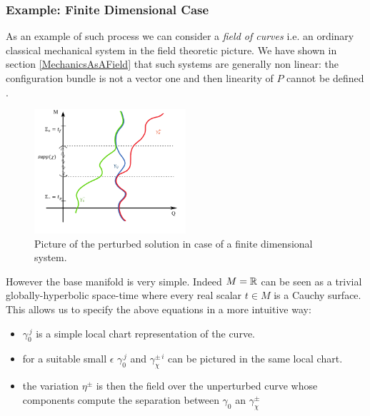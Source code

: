 \documentclass[Main]{subfiles}
\begin{document}
	\subsubsection{Example: Finite Dimensional Case} 
		As an example of such process we can consider a \emph{field of curves} i.e. an ordinary classical mechanical system in the field theoretic picture.
		We have shown in section \ref{MechanicsAsAField} that such systems are generally non linear: the configuration bundle is not a vector one and then linearity of $P$ cannot be defined .
	 	\begin{figure}[h!]\label{GraphicAdvRetSol}
				  \centering
   			\includegraphics[width=0.5\textwidth]{./Pictures/AdvRetSol} 
   	  		\caption{Picture of the perturbed solution in case of a finite dimensional system.}
		\end{figure}			
		
		However the base manifold is very simple. Indeed $M= \mathbb{R}$ can be seen as a trivial globally-hyperbolic space-time where every real scalar $t\in M$ is a Cauchy surface.
		This allows us to specify the above equations in a more intuitive way:
		\begin{itemize}
			\item $\gamma_0^{\, j}$ is a simple local chart representation of the curve.
			\item for a suitable small $\epsilon$  $\gamma_0^{\, j}$ and $\gamma_{\chi}^{\pm\,i} $ can be pictured in the same local chart.
			\item the variation $\eta^\pm$ is then the field over the unperturbed curve whose components compute the separation between $\gamma_0$ an $\gamma_{\chi}^{\pm} $
		\end{itemize}
	
	 	
\end{document}
